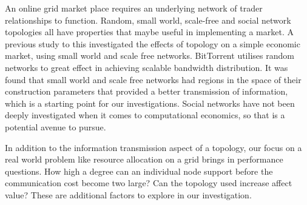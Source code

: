 An online grid market place requires an underlying network of trader
relationships to function. Random, small world, scale-free and social network
topologies all have properties that maybe useful in implementing a market.  A
previous study \cite{net-noble04-information} to this investigated the effects
of topology on a simple economic market, using small world and scale free
networks. BitTorrent \cite{net-cohen03-bittorrent} utilises random networks to
great effect in achieving scalable bandwidth distribution. It was found that
small world and scale free networks had regions in the space of their construction
parameters that provided a better transmission of information, which is a
starting point for our investigations. Social networks have not been deeply
investigated when it comes to computational economics, so that is a
potential avenue to pursue.

In addition to the information transmission aspect of a topology, our focus on
a real world problem like resource allocation on a grid brings in performance
questions. How high a degree can an individual node support before the
communication cost become two large? Can the topology used increase affect
value? These are additional factors to explore in our investigation.
